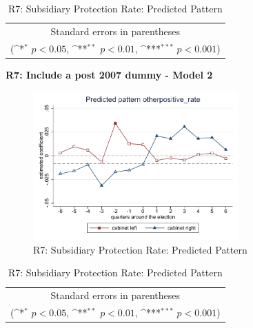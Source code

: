 \documentclass[10pt,a4paper]{scrartcl}
\begin{document}
\begin{table}[!ht]\centering
	\renewcommand{\arraystretch}{1.25}
	\def\sym#1{\ifmmode^{#1}\else\(^{#1}\)\fi}
	\caption{R7: Subsidiary Protection Rate: Predicted Pattern}
	\begin{tabular}{l*{2}{c}}
		\hline\hline
		
		\hline\hline
		\multicolumn{3}{c}{\footnotesize Standard errors in parentheses} \\
		\multicolumn{3}{c}{\footnotesize (\sym{*} \(p<0.05\), \sym{**} \(p<0.01\), \sym{***} \(p<0.001\))}\\
	\end{tabular}
\end{table}

\clearpage
\textbf{R7: Include a post 2007 dummy - Model 2}
\begin{figure}[!ht]
	\centering
	\includegraphics[width=0.7\textwidth]{figures_edited/otherpositive_rate_graph2_R7.pdf}
	\caption{R7: Subsidiary Protection Rate: Predicted Pattern}
\end{figure}

\begin{table}[!ht]\centering
	\footnotesize
	\renewcommand{\arraystretch}{1.2}
	\def\sym#1{\ifmmode^{#1}\else\(^{#1}\)\fi}
	\caption{R7: Subsidiary Protection Rate: Predicted Pattern}
	\begin{tabular}{l*{2}{c}}
		\hline\hline
		
		\hline\hline
		\multicolumn{3}{c}{\footnotesize Standard errors in parentheses} \\
		\multicolumn{3}{c}{\footnotesize (\sym{*} \(p<0.05\), \sym{**} \(p<0.01\), \sym{***} \(p<0.001\))} \\
	\end{tabular}
\end{table}
\end{document}
